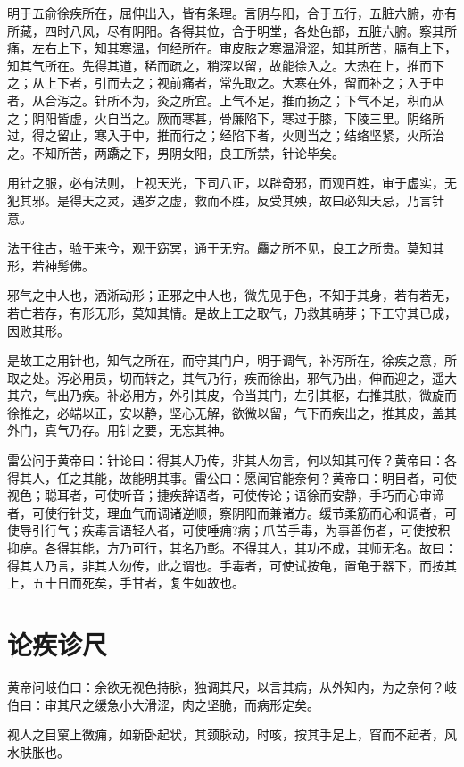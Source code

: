 \documentclass[a4paper,12pt,UTF8,twoside]{ctexbook}
\begin{document}
	明于五俞徐疾所在，屈伸出入，皆有条理。言阴与阳，合于五行，五脏六腑，亦有所藏，四时八风，尽有阴阳。各得其位，合于明堂，各处色部，五脏六腑。察其所痛，左右上下，知其寒温，何经所在。审皮肤之寒温滑涩，知其所苦，膈有上下，知其气所在。先得其道，稀而疏之，稍深以留，故能徐入之。大热在上，推而下之；从上下者，引而去之；视前痛者，常先取之。大寒在外，留而补之；入于中者，从合泻之。针所不为，灸之所宜。上气不足，推而扬之；下气不足，积而从之；阴阳皆虚，火自当之。厥而寒甚，骨廉陷下，寒过于膝，下陵三里。阴络所过，得之留止，寒入于中，推而行之；经陷下者，火则当之；结络坚紧，火所治之。不知所苦，两蹻之下，男阴女阳，良工所禁，针论毕矣。
	
	用针之服，必有法则，上视天光，下司八正，以辟奇邪，而观百姓，审于虚实，无犯其邪。是得天之灵，遇岁之虚，救而不胜，反受其殃，故曰必知天忌，乃言针意。
	
	法于往古，验于来今，观于窈冥，通于无穷。麤之所不见，良工之所贵。莫知其形，若神髣佛。
	
	邪气之中人也，洒淅动形；正邪之中人也，微先见于色，不知于其身，若有若无，若亡若存，有形无形，莫知其情。是故上工之取气，乃救其萌芽；下工守其已成，因败其形。
	
	是故工之用针也，知气之所在，而守其门户，明于调气，补泻所在，徐疾之意，所取之处。泻必用员，切而转之，其气乃行，疾而徐出，邪气乃出，伸而迎之，遥大其穴，气出乃疾。补必用方，外引其皮，令当其门，左引其枢，右推其肤，微旋而徐推之，必端以正，安以静，坚心无解，欲微以留，气下而疾出之，推其皮，盖其外门，真气乃存。用针之要，无忘其神。
	
	雷公问于黄帝曰：针论曰：得其人乃传，非其人勿言，何以知其可传？黄帝曰：各得其人，任之其能，故能明其事。雷公曰：愿闻官能奈何？黄帝曰：明目者，可使视色；聪耳者，可使听音；捷疾辞语者，可使传论；语徐而安静，手巧而心审谛者，可使行针艾，理血气而调诸逆顺，察阴阳而兼诸方。缓节柔筋而心和调者，可使导引行气；疾毒言语轻人者，可使唾痈?病；爪苦手毒，为事善伤者，可使按积抑痹。各得其能，方乃可行，其名乃彰。不得其人，其功不成，其师无名。故曰：得其人乃言，非其人勿传，此之谓也。手毒者，可使试按龟，置龟于器下，而按其上，五十日而死矣，手甘者，复生如故也。
	
	\chapter{论疾诊尺}
	
	黄帝问岐伯曰：余欲无视色持脉，独调其尺，以言其病，从外知内，为之奈何？岐伯曰：审其尺之缓急小大滑涩，肉之坚脆，而病形定矣。
	
	视人之目窠上微痈，如新卧起状，其颈脉动，时咳，按其手足上，窅而不起者，风水肤胀也。
	
\end{document}
